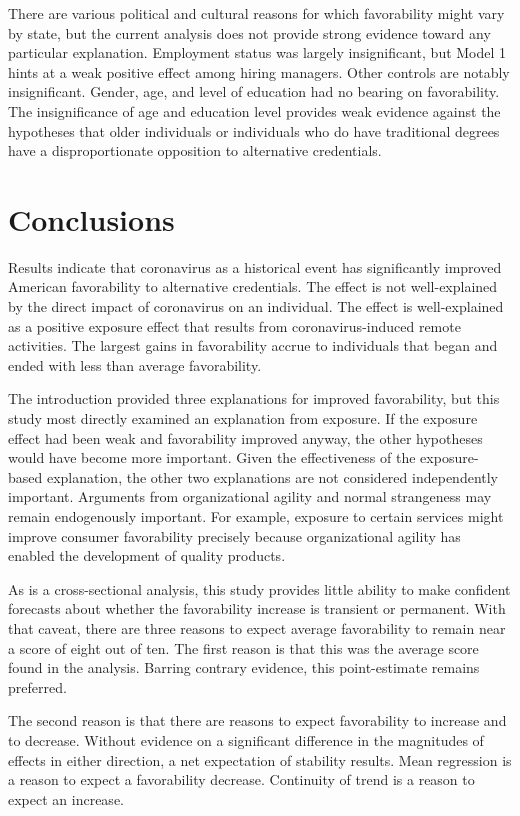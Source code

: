 There are various political and cultural reasons for which favorability might vary by state, but the current analysis does not provide strong evidence toward any particular explanation.
Employment status was largely insignificant, but Model 1 hints at a weak positive effect among hiring managers.
Other controls are notably insignificant.
Gender, age, and level of education had no bearing on favorability.
The insignificance of age and education level provides weak evidence
against the hypotheses that older individuals or individuals who do have traditional degrees
have a disproportionate opposition to alternative credentials.

\section{Conclusions}

Results indicate that coronavirus as a historical event has significantly improved American favorability to alternative credentials.
The effect is not well-explained by the direct impact of coronavirus on an individual.
The effect is well-explained as a positive exposure effect that results from coronavirus-induced remote activities.
The largest gains in favorability accrue to individuals that began and ended with less than average favorability.

The introduction provided three explanations for improved favorability,
but this study most directly examined an explanation from exposure.
If the exposure effect had been weak and favorability improved anyway,
the other hypotheses would have become more important.
Given the effectiveness of the exposure-based explanation, the other two explanations are not considered independently important.
Arguments from organizational agility and normal strangeness may remain endogenously important.
For example, exposure to certain services might improve consumer favorability precisely because
organizational agility has enabled the development of quality products.

As is a cross-sectional analysis,
this study provides little ability to make confident forecasts about whether the favorability increase is transient or permanent.
With that caveat, there are three reasons to expect average favorability to remain near a score of eight out of ten.
The first reason is that this was the average score found in the analysis.
Barring contrary evidence, this point-estimate remains preferred.

The second reason is that there are reasons to expect favorability to increase and to decrease.
Without evidence on a significant difference in the magnitudes of effects in either direction,
a net expectation of stability results.
Mean regression is a reason to expect a favorability decrease.
Continuity of trend is a reason to expect an increase.

